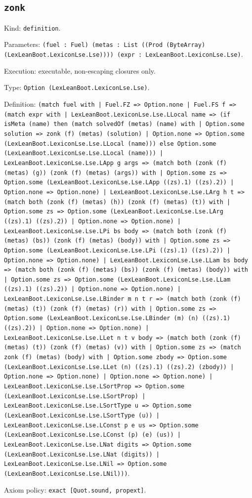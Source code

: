 \documentclass[11pt]{article}
\begin{document}
\subsection*{\texttt{zonk}}
\noindent Kind: \texttt{definition}.\par
\noindent Parameters: \texttt{(fuel : Fuel) (metas : List ((Prod (ByteArray) (LexLeanBoot.LexiconLse.Lse)))) (expr : LexLeanBoot.LexiconLse.Lse)}.\par
\noindent Execution: executable, non-escaping closures only.\par
\noindent Type: \texttt{Option (LexLeanBoot.LexiconLse.Lse)}.\par
\noindent Definition: \texttt{(match fuel with | Fuel.FZ => Option.none | Fuel.FS f => (match expr with | LexLeanBoot.LexiconLse.Lse.LLocal name => (if isMeta (name) then (match solvedOf (metas) (name) with | Option.some solution => zonk (f) (metas) (solution) | Option.none => Option.some (LexLeanBoot.LexiconLse.Lse.LLocal (name))) else Option.some (LexLeanBoot.LexiconLse.Lse.LLocal (name))) | LexLeanBoot.LexiconLse.Lse.LApp g args => (match both (zonk (f) (metas) (g)) (zonk (f) (metas) (args)) with | Option.some zs => Option.some (LexLeanBoot.LexiconLse.Lse.LApp ((zs).1) ((zs).2)) | Option.none => Option.none) | LexLeanBoot.LexiconLse.Lse.LArg h t => (match both (zonk (f) (metas) (h)) (zonk (f) (metas) (t)) with | Option.some zs => Option.some (LexLeanBoot.LexiconLse.Lse.LArg ((zs).1) ((zs).2)) | Option.none => Option.none) | LexLeanBoot.LexiconLse.Lse.LPi bs body => (match both (zonk (f) (metas) (bs)) (zonk (f) (metas) (body)) with | Option.some zs => Option.some (LexLeanBoot.LexiconLse.Lse.LPi ((zs).1) ((zs).2)) | Option.none => Option.none) | LexLeanBoot.LexiconLse.Lse.LLam bs body => (match both (zonk (f) (metas) (bs)) (zonk (f) (metas) (body)) with | Option.some zs => Option.some (LexLeanBoot.LexiconLse.Lse.LLam ((zs).1) ((zs).2)) | Option.none => Option.none) | LexLeanBoot.LexiconLse.Lse.LBinder m n t r => (match both (zonk (f) (metas) (t)) (zonk (f) (metas) (r)) with | Option.some zs => Option.some (LexLeanBoot.LexiconLse.Lse.LBinder (m) (n) ((zs).1) ((zs).2)) | Option.none => Option.none) | LexLeanBoot.LexiconLse.Lse.LLet n t v body => (match both (zonk (f) (metas) (t)) (zonk (f) (metas) (v)) with | Option.some zs => (match zonk (f) (metas) (body) with | Option.some zbody => Option.some (LexLeanBoot.LexiconLse.Lse.LLet (n) ((zs).1) ((zs).2) (zbody)) | Option.none => Option.none) | Option.none => Option.none) | LexLeanBoot.LexiconLse.Lse.LSortProp => Option.some (LexLeanBoot.LexiconLse.Lse.LSortProp) | LexLeanBoot.LexiconLse.Lse.LSortType u => Option.some (LexLeanBoot.LexiconLse.Lse.LSortType (u)) | LexLeanBoot.LexiconLse.Lse.LConst p e us => Option.some (LexLeanBoot.LexiconLse.Lse.LConst (p) (e) (us)) | LexLeanBoot.LexiconLse.Lse.LNat digits => Option.some (LexLeanBoot.LexiconLse.Lse.LNat (digits)) | LexLeanBoot.LexiconLse.Lse.LNil => Option.some (LexLeanBoot.LexiconLse.Lse.LNil)))}.\par
\noindent Axiom policy: \texttt{exact [Quot.sound, propext]}.\par
\end{document}

